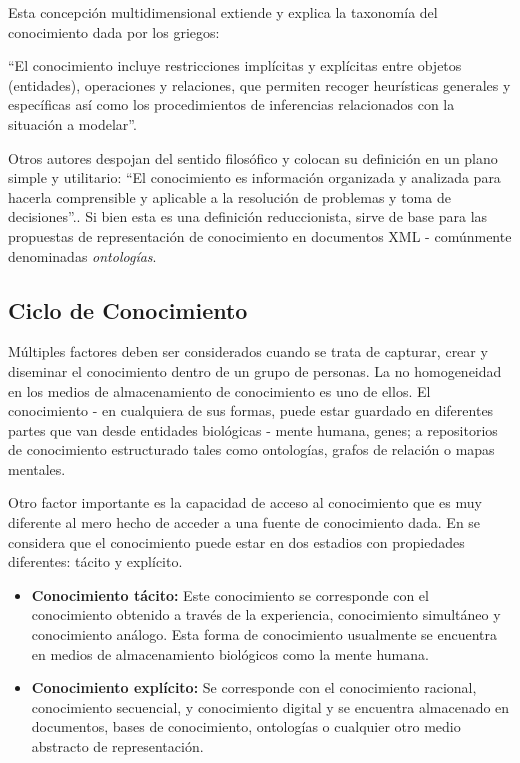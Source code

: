Esta concepción multidimensional extiende y explica la taxonomía del conocimiento dada por los griegos:

“El conocimiento incluye restricciones implícitas y explícitas entre objetos (entidades), operaciones y relaciones, que permiten recoger heurísticas generales y específicas así como los procedimientos de inferencias relacionados con la situación a modelar”.\cite{sowa1984}

Otros autores despojan del sentido filosófico y colocan su definición en un plano simple y utilitario: “El conocimiento es información organizada y analizada para hacerla comprensible y aplicable a la resolución de problemas y toma de decisiones”.\cite{turban1992}. Si bien esta es una definición reduccionista, sirve de base para las propuestas de representación de conocimiento en documentos XML - comúnmente denominadas \textit{ontologías}. 


\subsection{Ciclo de Conocimiento}

Múltiples factores deben ser considerados cuando se trata de capturar, crear y diseminar el conocimiento dentro de un grupo de personas. La no homogeneidad en los medios de almacenamiento de conocimiento es uno de ellos. El conocimiento - en cualquiera de sus formas, puede estar guardado en diferentes partes que van desde entidades biológicas - mente humana, genes; a repositorios de conocimiento estructurado tales como ontologías, grafos de relación o mapas mentales.

Otro factor importante es la capacidad de acceso al conocimiento que es muy diferente al mero hecho de acceder a una fuente de conocimiento dada. En \cite{nokata1995} se considera que el conocimiento puede estar en dos estadios con propiedades diferentes: tácito y explícito. 

\begin{itemize}
\item \textbf{Conocimiento tácito:} Este conocimiento se corresponde con el conocimiento obtenido a través de la experiencia, conocimiento simultáneo  y conocimiento análogo. Esta forma de conocimiento usualmente se encuentra en medios de almacenamiento biológicos como la mente humana.

\item \textbf{Conocimiento explícito:} Se corresponde con el conocimiento racional, conocimiento secuencial, y conocimiento digital y se encuentra almacenado en documentos, bases de conocimiento, ontologías o cualquier otro medio abstracto de representación.
\end{itemize}

